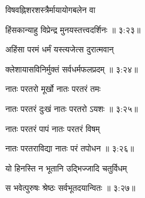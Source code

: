 {\devanagarifont विषवह्निशरशस्त्रैर्मायायोगबलेन वा \thinspace{\dandab} \dontdisplaylinenum }%


{\devanagarifont हिंसकान्याहु विप्रेन्द्र मुनयस्तत्त्वदर्शिनः {॥ ३:२३॥} \veg\dontdisplaylinenum }%



{\devanagarifont अहिंसा परमं धर्मं यस्त्यजेत्स दुरात्मवान् \thinspace{\dandab} \dontdisplaylinenum }%


{\devanagarifont क्लेशायासविनिर्मुक्तं सर्वधर्मफलप्रदम् {॥ ३:२४॥} \veg\dontdisplaylinenum }%
 
{\devanagarifont नातः परतरो मूर्खो नातः परतरं तमः \thinspace{\dandab} \dontdisplaylinenum }%


{\devanagarifont नातः परतरं दुःखं नातः परतरो ऽयशः {॥ ३:२५॥} \veg\dontdisplaylinenum }%
 
{\devanagarifont नातः परतरं पापं नातः परतरं विषम् \thinspace{\dandab} \dontdisplaylinenum }%
 

{\devanagarifont नातः परतराविद्या नातः परं तपोधन {॥ ३:२६॥} \veg\dontdisplaylinenum }%

{\devanagarifont यो हिनस्ति न भूतानि उद्भिज्जादि चतुर्विधम् \thinspace{\dandab} \dontdisplaylinenum }%


{\devanagarifont स भवेत्पुरुषः श्रेष्ठः सर्वभूतदयान्वितः {॥ ३:२७॥} \veg\dontdisplaylinenum }%

